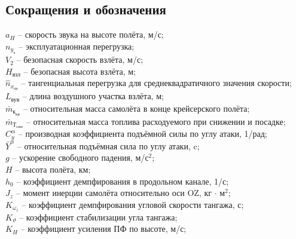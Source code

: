 \newpage
\pagestyle{fancy}
\fancyhf{}
    \rfoot{ \thepage}
\begin{center}
     \section*{Сокращения и обозначения}
\end{center}
\newcommand{\Mza}{\bar{M}_z^\alpha}
\newcommand{\Mzwz}{\bar{M}_z^{\omega_z}}
\newcommand{\mza}{m_z^\alpha}
\newcommand{\mzwz}{m_z^{\omega_z}}
\newcommand{\mzf}{m_z^{\delta_{\text{э}}}}
\newcommand{\Cya}{C_y^\alpha}
\newcommand{\Mzf}{\bar{M}_z^{\delta_\text{э}}}
\newcommand{\mzwzch}{m_z^{\bar{\omega}_z}}
\newcommand{\mkkr}{\bar{m}_{\text{к}_\text{кр}}}
\newcommand{\mtcnp}{\bar{m}_{\text{Т}_\text{снп}}}
\newcommand{\ones}{\frac{1}{с}}
$a_H$ -- скорость звука на высоте полёта, м/с; \\
$n_{y_\text{э}}$ -- эксплуатационная перегрузка; \\
$V_2$ -- безопасная скорость взлёта, м/с;\\
$H_\text{взл}$ -- безопасная высота взлёта, м;\\
$\hat{n}_{x_\text{ср}}$ -- тангенциальная перегрузка для среднеквадратичного значения скорости;\\
$L_\text{вув}$ -- длина воздушного участка взлёта, м;\\
$\mkkr$ -- относительная масса самолёта в конце крейсерского полёта;\\
$\mtcnp$ -- относительная масса топлива расходуемого при снижении и посадке; \\
$\Cya$ -- производная коэффициента подъёмной силы по углу атаки, 1/рад; \\ 
$\bar{Y}^{\alpha}$ -- относительная подъёмная сила по углу атаки, c; \\
$g$ -- ускорение свободного падения, м/с$^2$; \\ 
$H$ -- высота полёта, км; \\ 
$h_0$ -- коэффициент демпфирования в продольном канале, 1/с;\\
$J_z$ -- момент инерции самолёта относительно оси OZ, кг $\cdot$ м$^2$; \\ 
$K_{\omega_z}$ -- коэффициент демпфирования угловой скорости тангажа, с;  \\
$K_{\vartheta}$ -- коэффициент стабилизации угла тангажа;\\
$K_H$ -- коэффициент усиления ПФ по высоте, м/с;\\
